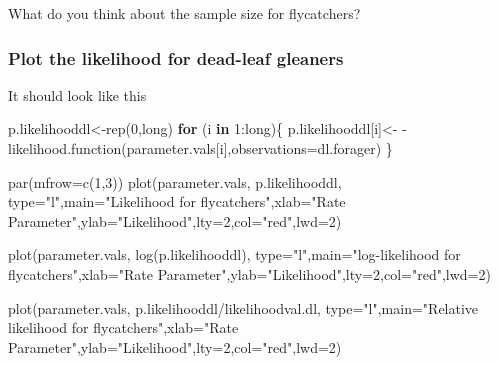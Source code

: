 \documentclass[
]{book}
\newenvironment{Shaded}{\begin{snugshade}}{\end{snugshade}}
\newcommand{\AttributeTok}[1]{\textcolor[rgb]{0.77,0.63,0.00}{#1}}
\newcommand{\ControlFlowTok}[1]{\textcolor[rgb]{0.13,0.29,0.53}{\textbf{#1}}}
\newcommand{\DecValTok}[1]{\textcolor[rgb]{0.00,0.00,0.81}{#1}}
\newcommand{\FunctionTok}[1]{\textcolor[rgb]{0.00,0.00,0.00}{#1}}
\newcommand{\NormalTok}[1]{#1}
\newcommand{\OtherTok}[1]{\textcolor[rgb]{0.56,0.35,0.01}{#1}}
\newcommand{\SpecialCharTok}[1]{\textcolor[rgb]{0.00,0.00,0.00}{#1}}
\newcommand{\StringTok}[1]{\textcolor[rgb]{0.31,0.60,0.02}{#1}}
\begin{document}
What do you think about the sample size for flycatchers?

\hypertarget{plot-the-likelihood-for-dead-leaf-gleaners}{%
\subsubsection{Plot the likelihood for dead-leaf gleaners}\label{plot-the-likelihood-for-dead-leaf-gleaners}}

It should look like this

\begin{Shaded}
\begin{Highlighting}[]
\NormalTok{p.likelihooddl}\OtherTok{\textless{}{-}}\FunctionTok{rep}\NormalTok{(}\DecValTok{0}\NormalTok{,long)}
\ControlFlowTok{for}\NormalTok{ (i }\ControlFlowTok{in} \DecValTok{1}\SpecialCharTok{:}\NormalTok{long)\{}
\NormalTok{p.likelihooddl[i]}\OtherTok{\textless{}{-}} \SpecialCharTok{{-}}\FunctionTok{likelihood.function}\NormalTok{(parameter.vals[i],}\AttributeTok{observations=}\NormalTok{dl.forager)}
\NormalTok{\}}

\FunctionTok{par}\NormalTok{(}\AttributeTok{mfrow=}\FunctionTok{c}\NormalTok{(}\DecValTok{1}\NormalTok{,}\DecValTok{3}\NormalTok{))}
\FunctionTok{plot}\NormalTok{(parameter.vals, p.likelihooddl, }\AttributeTok{type=}\StringTok{"l"}\NormalTok{,}\AttributeTok{main=}\StringTok{"Likelihood for flycatchers"}\NormalTok{,}\AttributeTok{xlab=}\StringTok{"Rate Parameter"}\NormalTok{,}\AttributeTok{ylab=}\StringTok{"Likelihood"}\NormalTok{,}\AttributeTok{lty=}\DecValTok{2}\NormalTok{,}\AttributeTok{col=}\StringTok{"red"}\NormalTok{,}\AttributeTok{lwd=}\DecValTok{2}\NormalTok{)}

\FunctionTok{plot}\NormalTok{(parameter.vals, }\FunctionTok{log}\NormalTok{(p.likelihooddl), }\AttributeTok{type=}\StringTok{"l"}\NormalTok{,}\AttributeTok{main=}\StringTok{"log{-}likelihood for flycatchers"}\NormalTok{,}\AttributeTok{xlab=}\StringTok{"Rate Parameter"}\NormalTok{,}\AttributeTok{ylab=}\StringTok{"Likelihood"}\NormalTok{,}\AttributeTok{lty=}\DecValTok{2}\NormalTok{,}\AttributeTok{col=}\StringTok{"red"}\NormalTok{,}\AttributeTok{lwd=}\DecValTok{2}\NormalTok{)}

\FunctionTok{plot}\NormalTok{(parameter.vals, p.likelihooddl}\SpecialCharTok{/}\NormalTok{likelihoodval.dl, }\AttributeTok{type=}\StringTok{"l"}\NormalTok{,}\AttributeTok{main=}\StringTok{"Relative likelihood for flycatchers"}\NormalTok{,}\AttributeTok{xlab=}\StringTok{"Rate Parameter"}\NormalTok{,}\AttributeTok{ylab=}\StringTok{"Likelihood"}\NormalTok{,}\AttributeTok{lty=}\DecValTok{2}\NormalTok{,}\AttributeTok{col=}\StringTok{"red"}\NormalTok{,}\AttributeTok{lwd=}\DecValTok{2}\NormalTok{)}
\end{Highlighting}
\end{Shaded}
\end{document}
